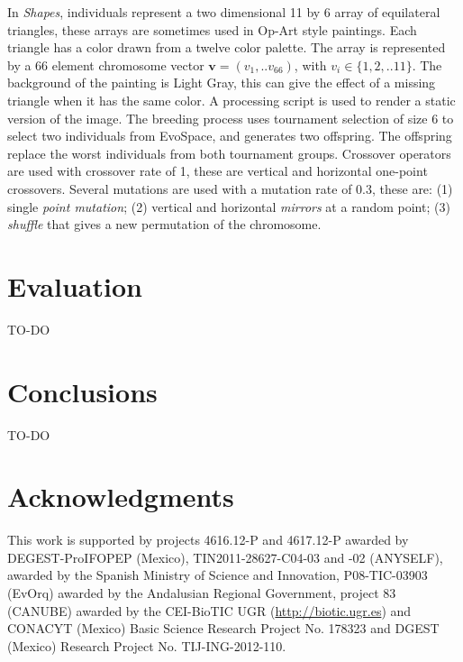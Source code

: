 \documentclass{sig-alternate}
\begin{document}
In \emph{Shapes}, individuals represent a two dimensional 11 by 6 array of equilateral triangles, these arrays are sometimes used in Op-Art style paintings.
Each triangle has a color drawn from a twelve color palette.
The array is represented by a 66 element chromosome vector $\mathbf{v}=(v_1,..v_{66})$, with $v_i \in \{ 1,2,..11 \}$.
The background of the painting is Light Gray, this can give the effect of a missing triangle when it has the same color.
A processing script is used to render a static version of the image.
The breeding process uses tournament selection of size 6 to select two individuals from EvoSpace,
and generates two offspring.
The offspring replace the worst individuals from both tournament groups.
Crossover operators are used with crossover rate of 1, these are vertical and horizontal one-point crossovers.
Several mutations are used with a mutation rate of 0.3, these are:
(1) single \emph{point mutation}; (2) vertical and horizontal \emph{mirrors} at a random point;
(3) \emph{shuffle} that gives a new permutation of the chromosome.

\section{Evaluation}
TO-DO
\section{Conclusions}
TO-DO


\section{Acknowledgments}
This work is supported by projects 4616.12-P and 4617.12-P awarded by DEGEST-ProIFOPEP (Mexico), TIN2011-28627-C04-03 and -02 (ANYSELF), awarded by the Spanish Ministry of Science and Innovation, P08-TIC-03903 (EvOrq) awarded by the Andalusian Regional Government, project 83 (CANUBE) awarded by the CEI-BioTIC UGR
(\url{http://biotic.ugr.es}) and CONACYT (Mexico) Basic Science Research Project No. 178323 and DGEST (Mexico) Research Project No. TIJ-ING-2012-110.

%

%
%
\end{document}
